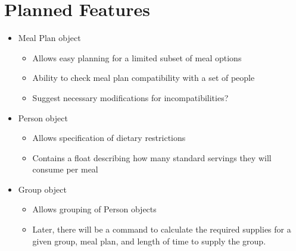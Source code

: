 \documentclass{article}
\begin{document}
\section{Planned Features}
\begin{itemize}
	\item Meal Plan object
	
	\begin{itemize}
		\item Allows easy planning for a limited subset of meal options 
		\item Ability to check meal plan compatibility with a set of people
		\item Suggest necessary modifications for incompatibilities?
	\end{itemize}

	\item Person object 

	\begin{itemize}
		\item Allows specification of dietary restrictions 
		\item Contains a float describing how many standard servings they will consume per meal 
	\end{itemize}

	\item Group object 

	\begin{itemize}
		\item Allows grouping of Person objects 
		\item Later, there will be a command to calculate the required supplies for a given group, meal plan, and length of time 
			to supply the group. 
	\end{itemize}

\end{itemize}
\end{document}
